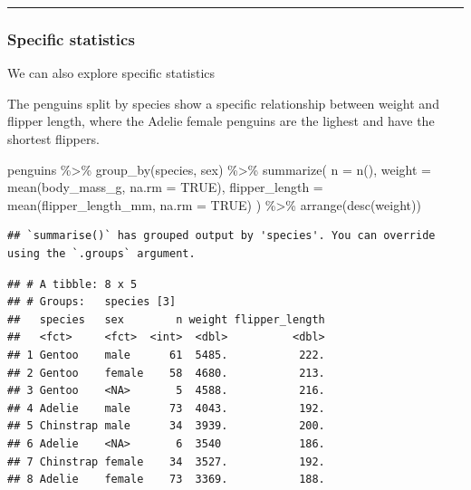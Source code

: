 \documentclass[
]{article}
\newenvironment{Shaded}{\begin{snugshade}}{\end{snugshade}}
\newcommand{\AttributeTok}[1]{\textcolor[rgb]{0.77,0.63,0.00}{#1}}
\newcommand{\ConstantTok}[1]{\textcolor[rgb]{0.00,0.00,0.00}{#1}}
\newcommand{\FunctionTok}[1]{\textcolor[rgb]{0.00,0.00,0.00}{#1}}
\newcommand{\NormalTok}[1]{#1}
\newcommand{\SpecialCharTok}[1]{\textcolor[rgb]{0.00,0.00,0.00}{#1}}
\begin{document}
\begin{center}\rule{0.5\linewidth}{0.5pt}\end{center}

\hypertarget{specific-statistics}{%
\subsubsection{Specific statistics}\label{specific-statistics}}

We can also explore specific statistics

The penguins split by species show a specific relationship between
weight and flipper length, where the Adelie female penguins are the
lighest and have the shortest flippers.

\begin{Shaded}
\begin{Highlighting}[]
\NormalTok{penguins }\SpecialCharTok{\%\textgreater{}\%} 
  \FunctionTok{group\_by}\NormalTok{(species, sex) }\SpecialCharTok{\%\textgreater{}\%} 
  \FunctionTok{summarize}\NormalTok{(}
    \AttributeTok{n =} \FunctionTok{n}\NormalTok{(), }
    \AttributeTok{weight =} \FunctionTok{mean}\NormalTok{(body\_mass\_g, }\AttributeTok{na.rm =} \ConstantTok{TRUE}\NormalTok{),}
    \AttributeTok{flipper\_length =} \FunctionTok{mean}\NormalTok{(flipper\_length\_mm, }\AttributeTok{na.rm =} \ConstantTok{TRUE}\NormalTok{)}
\NormalTok{    ) }\SpecialCharTok{\%\textgreater{}\%} 
  \FunctionTok{arrange}\NormalTok{(}\FunctionTok{desc}\NormalTok{(weight))}
\end{Highlighting}
\end{Shaded}

\begin{verbatim}
## `summarise()` has grouped output by 'species'. You can override using the `.groups` argument.
\end{verbatim}

\begin{verbatim}
## # A tibble: 8 x 5
## # Groups:   species [3]
##   species   sex        n weight flipper_length
##   <fct>     <fct>  <int>  <dbl>          <dbl>
## 1 Gentoo    male      61  5485.           222.
## 2 Gentoo    female    58  4680.           213.
## 3 Gentoo    <NA>       5  4588.           216.
## 4 Adelie    male      73  4043.           192.
## 5 Chinstrap male      34  3939.           200.
## 6 Adelie    <NA>       6  3540            186.
## 7 Chinstrap female    34  3527.           192.
## 8 Adelie    female    73  3369.           188.
\end{verbatim}
\end{document}
